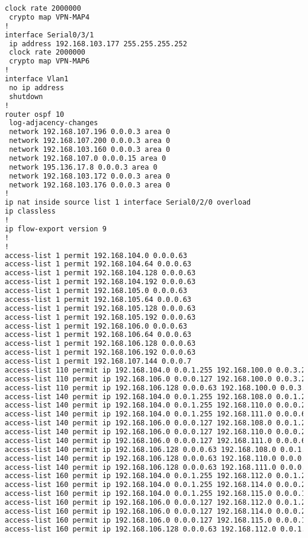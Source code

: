 \begin{lstlisting}[language=Bash, caption={Configuración Completa Router Manacor}]
 clock rate 2000000
 crypto map VPN-MAP4
!
interface Serial0/3/1
 ip address 192.168.103.177 255.255.255.252
 clock rate 2000000
 crypto map VPN-MAP6
!
interface Vlan1
 no ip address
 shutdown
!
router ospf 10
 log-adjacency-changes
 network 192.168.107.196 0.0.0.3 area 0
 network 192.168.107.200 0.0.0.3 area 0
 network 192.168.103.160 0.0.0.3 area 0
 network 192.168.107.0 0.0.0.15 area 0
 network 195.136.17.8 0.0.0.3 area 0
 network 192.168.103.172 0.0.0.3 area 0
 network 192.168.103.176 0.0.0.3 area 0
!
ip nat inside source list 1 interface Serial0/2/0 overload
ip classless
!
ip flow-export version 9
!
!
access-list 1 permit 192.168.104.0 0.0.0.63
access-list 1 permit 192.168.104.64 0.0.0.63
access-list 1 permit 192.168.104.128 0.0.0.63
access-list 1 permit 192.168.104.192 0.0.0.63
access-list 1 permit 192.168.105.0 0.0.0.63
access-list 1 permit 192.168.105.64 0.0.0.63
access-list 1 permit 192.168.105.128 0.0.0.63
access-list 1 permit 192.168.105.192 0.0.0.63
access-list 1 permit 192.168.106.0 0.0.0.63
access-list 1 permit 192.168.106.64 0.0.0.63
access-list 1 permit 192.168.106.128 0.0.0.63
access-list 1 permit 192.168.106.192 0.0.0.63
access-list 1 permit 192.168.107.144 0.0.0.7
access-list 110 permit ip 192.168.104.0 0.0.1.255 192.168.100.0 0.0.3.255
access-list 110 permit ip 192.168.106.0 0.0.0.127 192.168.100.0 0.0.3.255
access-list 110 permit ip 192.168.106.128 0.0.0.63 192.168.100.0 0.0.3.255
access-list 140 permit ip 192.168.104.0 0.0.1.255 192.168.108.0 0.0.1.255
access-list 140 permit ip 192.168.104.0 0.0.1.255 192.168.110.0 0.0.0.255
access-list 140 permit ip 192.168.104.0 0.0.1.255 192.168.111.0 0.0.0.63
access-list 140 permit ip 192.168.106.0 0.0.0.127 192.168.108.0 0.0.1.255
access-list 140 permit ip 192.168.106.0 0.0.0.127 192.168.110.0 0.0.0.255
access-list 140 permit ip 192.168.106.0 0.0.0.127 192.168.111.0 0.0.0.63
access-list 140 permit ip 192.168.106.128 0.0.0.63 192.168.108.0 0.0.1.255
access-list 140 permit ip 192.168.106.128 0.0.0.63 192.168.110.0 0.0.0.255
access-list 140 permit ip 192.168.106.128 0.0.0.63 192.168.111.0 0.0.0.63
access-list 160 permit ip 192.168.104.0 0.0.1.255 192.168.112.0 0.0.1.255
access-list 160 permit ip 192.168.104.0 0.0.1.255 192.168.114.0 0.0.0.255
access-list 160 permit ip 192.168.104.0 0.0.1.255 192.168.115.0 0.0.0.127
access-list 160 permit ip 192.168.106.0 0.0.0.127 192.168.112.0 0.0.1.255
access-list 160 permit ip 192.168.106.0 0.0.0.127 192.168.114.0 0.0.0.255
access-list 160 permit ip 192.168.106.0 0.0.0.127 192.168.115.0 0.0.0.127
access-list 160 permit ip 192.168.106.128 0.0.0.63 192.168.112.0 0.0.1.255

\end{lstlisting}
